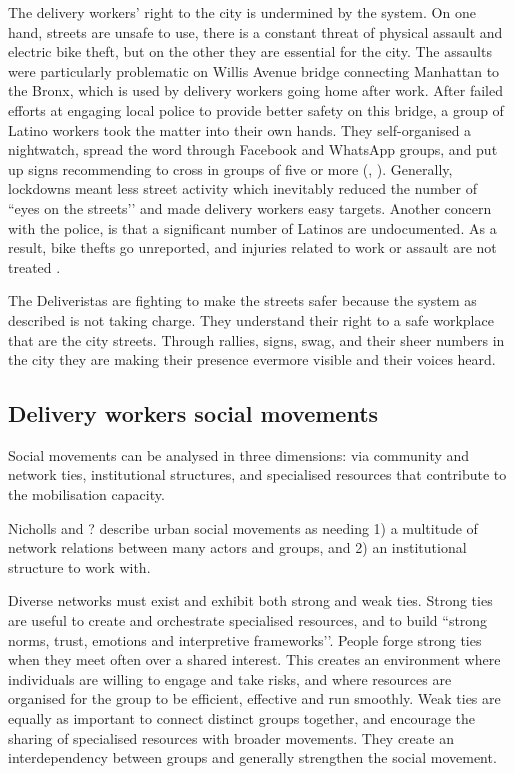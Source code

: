 \documentclass{article}
\begin{document}
The delivery workers’ right to the city is undermined by the system. On one hand, streets are unsafe to use, there is a constant threat of physical assault and electric bike theft, but on the other they are essential for the city. The assaults were particularly problematic on Willis Avenue bridge connecting Manhattan to the Bronx, which is used by delivery workers going home after work. After failed efforts at engaging local police to provide better safety on this bridge, a group of Latino workers took the matter into their own hands. They self-organised a nightwatch, spread the word through Facebook and WhatsApp groups, and put up signs recommending to cross in groups of five or more (\cite{vox2021}, \cite{curbed2021}). Generally, lockdowns meant less street activity which inevitably reduced the number of ``eyes on the streets’’ \parencite{jacobs2007uses} and made delivery workers easy targets.
Another concern with the police, is that a significant number of Latinos are undocumented. As a result, bike thefts go unreported, and injuries related to work or assault are not treated \parencite{brictv}.

The Deliveristas are fighting to make the streets safer because the system as described is not taking charge. They understand their right to a safe workplace that are the city streets. Through rallies, signs, swag, and their sheer numbers in the city they are making their presence evermore visible and their voices heard.

\subsection{Delivery workers social movements}

Social movements can be analysed in three dimensions: via community and network ties, institutional structures, and specialised resources that contribute to the mobilisation capacity.

Nicholls and ? describe urban social movements as needing 1) a multitude of network relations between many actors and groups, and 2) an institutional structure to work with.

Diverse networks must exist and exhibit both strong and weak ties. Strong ties are useful to create and orchestrate specialised resources, and to build ``strong norms, trust, emotions and interpretive frameworks’’\cite{nicholls2008urban}. People forge strong ties when they meet often over a shared interest. This creates an environment where individuals are willing to engage and take risks, and where resources are organised for the group to be efficient, effective and run smoothly. 
Weak ties are equally as important to connect distinct groups together, and encourage the sharing of specialised resources with broader movements. They create an interdependency between groups and generally strengthen the social movement.
\end{document}
